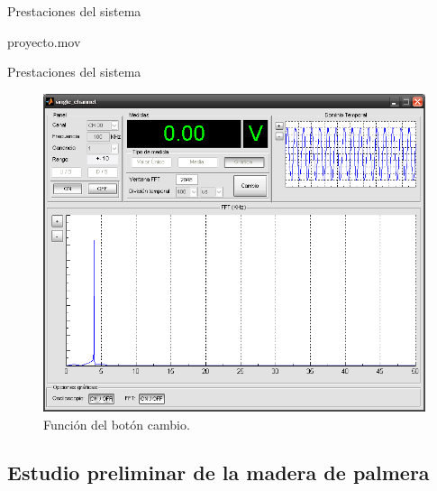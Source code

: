 \documentclass[utf8, compress]			{beamer}
\begin{document}
\begin{frame}{Prestaciones del sistema}
    \begin{center}
	    {proyecto.mov}
    \end{center}
\end{frame}

\begin{frame}{Prestaciones del sistema}
    \begin{figure}
	\includegraphics{softwarebis.png}
	\caption{Función del botón cambio.}
	\label{fig:softwarebis}
    \end{figure}
\end{frame}


\subsection{Estudio preliminar de la madera de palmera}
\end{document}
